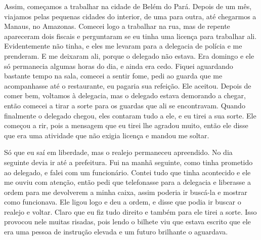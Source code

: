 Assim, começamos a trabalhar na cidade de Belém do Pará. Depois de um
mês, viajamos pelas pequenas cidades do interior, de uma para
outra, até chegarmos a Manaus, no Amazonas. Comecei logo a trabalhar na
rua, mas de repente apareceram dois fiscais e perguntaram se eu tinha uma
licença para trabalhar ali. Evidentemente não tinha, e eles me
levaram para a delegacia de polícia e me prenderam. E me deixaram ali,
porque o delegado não estava. Era domingo e ele só permanecia algumas
horas do dia, e ainda era cedo. Fiquei aguardando bastante tempo na
sala, comecei a sentir fome, pedi ao guarda que me acompanhasse até o
restaurante, eu pagaria sua refeição. Ele aceitou. Depois de comer
bem, voltamos à delegacia, mas o delegado estava demorando a chegar,
então comecei a tirar a sorte para os guardas que ali se encontravam.
Quando finalmente o delegado chegou, eles contaram tudo a ele, e eu
tirei a sua sorte. Ele começou a rir, pois a mensagem que eu tirei lhe
agradou muito, então ele disse que era uma atividade que não exigia
licença e mandou me soltar.

Só que eu saí em liberdade, mas o realejo permaneceu apreendido. No dia
seguinte devia ir até a prefeitura. Fui na manhã seguinte, como tinha
prometido ao delegado, e falei com um funcionário. Contei tudo que tinha
acontecido e ele me ouviu com atenção, então pedi que telefonasse para a
delegacia e liberasse a ordem para me devolverem a minha caixa, assim poderia
ir buscá-la e mostrar como funcionava. Ele ligou logo e deu a ordem, e
disse que podia ir buscar o realejo e voltar. Claro que eu fiz tudo
direito e também para ele tirei a sorte. Isso provocou nele muitas
risadas, pois lendo o bilhete viu que estava escrito que ele era uma
pessoa de instrução elevada e um futuro brilhante o aguardava.


